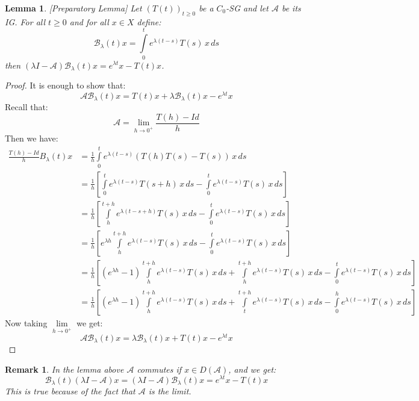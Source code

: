 \documentclass[12pt, oneside]{book}
\newtheorem{remark}{Remark}[section]
\newtheorem{lemma}{Lemma}[section]
\newcommand{\A}{\mathscr{A}}
\newcommand{\B}{\mathscr{B}}
\begin{document}
\begin{lemma}\label{spec:prep}[Preparatory Lemma]
	Let $(T(t))_{t \ge 0}$ be a $C_0$-SG and let $\A$ be its IG. For all $t \ge 0$ and for all $x \in X$ define:
	$$
	\B_{\lambda}(t)x = \int\limits_{0}^{t} e^{\lambda(t-s)}T(s) \, x \, ds
	$$
	then $(\lambda I - \A)\B_{\lambda}(t)x = e^{\lambda t}x - T(t)x$.
\end{lemma}

\begin{proof}
	It is enough to show that:
	$$
	\A \B_{\lambda}(t)x = T(t)x  + \lambda \B_{\lambda}(t)x - e^{\lambda t}x
	$$
	Recall that:
	$$
	\A = \lim\limits_{h \to 0^{+}} \frac{T(h) - Id}{h}
	$$
	Then we have:
	\begingroup
	\allowdisplaybreaks
	\begin{align*}
		\frac{T(h) - Id}{h} B_{\lambda}(t)x &= \frac{1}{h} \int\limits_{0}^{t} e^{\lambda(t-s)}\left(T(h)T(s) - T(s)\right) \, x \, ds \\
						    &= \frac{1}{h} \left[\int\limits_{0}^{t} e^{\lambda(t-s)} T(s + h)\, x \, ds - \int\limits_{0}^{t} e^{\lambda(t-s)} T(s) \, x \, ds\right] \\
						    &= \frac{1}{h} \left[\int\limits_{h}^{t + h} e^{\lambda(t-s + h)} T(s)\, x \, ds - \int\limits_{0}^{t} e^{\lambda(t-s)} T(s) \, x \, ds\right] \\
						    &= \frac{1}{h} \left[e^{\lambda h}\int\limits_{h}^{t + h} e^{\lambda(t - s)} T(s)\, x \, ds - \int\limits_{0}^{t} e^{\lambda(t-s)} T(s) \, x \, ds\right] \\
						    &= \frac{1}{h} \left[\left(e^{\lambda h} - 1\right)\int\limits_{h}^{t + h} e^{\lambda(t - s)} T(s)\, x \, ds + \int\limits_{h}^{t + h} e^{\lambda(t - s)} T(s)\, x \, ds - \int\limits_{0}^{t} e^{\lambda(t-s)} T(s) \, x \, ds\right] \\
						    &= \frac{1}{h} \left[\left(e^{\lambda h} - 1\right)\int\limits_{h}^{t + h} e^{\lambda(t - s)} T(s)\, x \, ds + \int\limits_{t}^{t + h} e^{\lambda(t - s)} T(s)\, x \, ds - \int\limits_{0}^{h} e^{\lambda(t-s)} T(s) \, x \, ds\right]
	\end{align*}
	Now taking $\lim\limits_{h \to 0^{+}}$ we get:
	$$
	\A \B_{\lambda}(t)x = \lambda \B_{\lambda}(t)x + T(t)x - e^{\lambda t}x
	$$
	\endgroup
\end{proof}

\begin{remark}
	In the lemma above $\A$ commutes if $x \in D(\A)$, and we get:
	$$
\B_{\lambda}(t)(\lambda I - \A)x = (\lambda I - \A)\B_{\lambda}(t)x = e^{\lambda t}x - T(t)x
	$$
	This is true because of the fact that $\A$ is the limit.
\end{remark}
\end{document}
